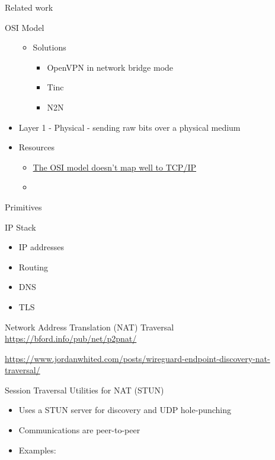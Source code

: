 \begin{frame}[fragile]{Related work}
\begin{block}{OSI Model}
\begin{itemize}
  \begin{itemize}
  \tightlist
  \item
    Solutions

    \begin{itemize}
    \tightlist
    \item
      OpenVPN in network bridge mode
    \item
      Tinc
    \item
      N2N
    \end{itemize}
  \end{itemize}
\item
  Layer 1 - Physical - sending raw bits over a physical medium
\item
  Resources

  \begin{itemize}
  \tightlist
  \item
    \href{https://jvns.ca/blog/2021/05/11/what-s-the-osi-model-/}{The
    OSI model doesn't map well to TCP/IP}
  \item
  \end{itemize}
\end{itemize}
\end{block}

\begin{block}{Primitives}
\protect\hypertarget{primitives}{}
\begin{block}{IP Stack}
\protect\hypertarget{ip-stack}{}
\begin{itemize}
\tightlist
\item
  IP addresses
\item
  Routing
\item
  DNS
\item
  TLS
\end{itemize}

\begin{block}{Network Address Translation (NAT) Traversal}
\protect\hypertarget{network-address-translation-nat-traversal}{}
\url{https://bford.info/pub/net/p2pnat/}

\url{https://www.jordanwhited.com/posts/wireguard-endpoint-discovery-nat-traversal/}
\end{block}

\begin{block}{Session Traversal Utilities for NAT (STUN)}
\protect\hypertarget{session-traversal-utilities-for-nat-stun}{}
\begin{itemize}
\tightlist
\item
  Uses a STUN server for discovery and UDP hole-punching
\item
  Communications are peer-to-peer
\item
  Examples:


\end{itemize}
\end{block}
\end{block}
\end{block}
\end{frame}
